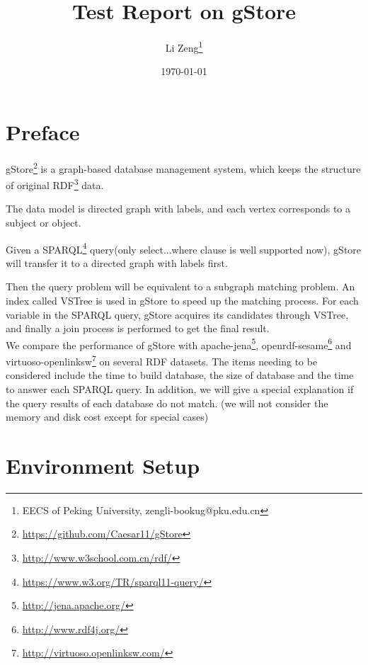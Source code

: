 \documentclass[titlepage, a4paper, 12pt] {article}
\begin{document}
\title{\textbf{Test Report on gStore}}
\author{Li Zeng\footnote{EECS of Peking University, zengli-bookug@pku.edu.cn}}
\date{\today}
\maketitle

\setcounter{tocdepth}{3}
\tableofcontents
\clearpage

\section{Preface}

gStore\footnote{\href{https://github.com/Caesar11/gStore}{https://github.com/Caesar11/gStore}} is a graph-based database management system, which keeps the structure of original RDF\footnote{\href{http://www.w3school.com.cn/rdf/}{http://www.w3school.com.cn/rdf/}} data. 

The data model is directed graph with labels, and each vertex corresponds to a subject or object. 

Given a SPARQL\footnote{\href{https://www.w3.org/TR/sparql11-query/}{https://www.w3.org/TR/sparql11-query/}} query(only select...where clause is well supported now), gStore will transfer it to a directed graph with labels first.

Then the query problem will be equivalent to a subgraph matching problem.
An index called VSTree is used in gStore to speed up the matching process. For each variable in the SPARQL query, gStore acquires its candidates through VSTree, and finally a join process is performed to get the final result.  \\

We compare the performance of gStore with apache-jena\footnote{\href{http://jena.apache.org/}{http://jena.apache.org/}}, openrdf-sesame\footnote{\href{http://www.rdf4j.org/}{http://www.rdf4j.org/}} and virtuoso-openlinksw\footnote{\href{http://virtuoso.openlinksw.com/}{http://virtuoso.openlinksw.com/}} on several RDF datasets.
The items needing to be considered include the time to build database, the size of database and the time to answer each SPARQL query.
In addition, we will give a special explanation if the query results of each database do not match.
(we will not consider the memory and disk cost except for special cases) \\

\clearpage

\section{Environment Setup}
\end{document}
